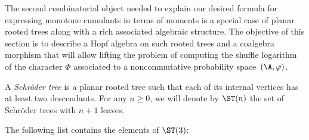 The second combinatorial object needed to explain our desired formula for expressing monotone cumulants in terms of moments is a special case of planar rooted trees along with a rich associated algebraic structure. The objective of this section is to describe a Hopf algebra on such rooted trees and a coalgebra morphism that will allow lifting the problem of computing the shuffle logarithm of the character $\Phi$ associated to a noncommutative probability space~$(\A,\varphi)$.

\begin{Definition}A \textit{Schr\"oder tree} is a planar rooted tree such that each of its internal vertices has at least two descendants. For any $n\geq0$, we will denote by $\ST(n)$ the set of Schr\"oder trees with $n+1$ leaves.
\end{Definition}
\begin{Example}
The following list contains the elements of $\ST(3)$:


\end{Example}
